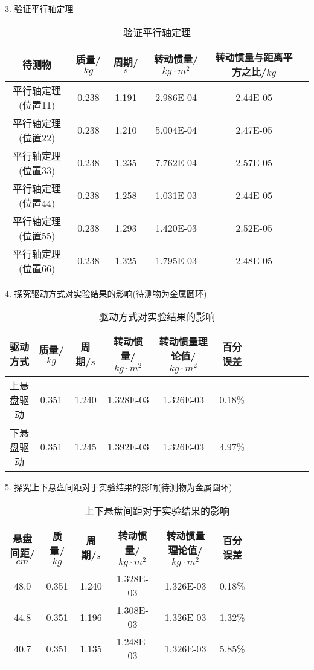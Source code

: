 \documentclass[12pt,hyperref,a4paper,UTF8]{ctexart}
\begin{document}
3. 验证平行轴定理

\begin{table}[h!]
\centering

\begin{tabular}{|c|c|c|c|c|c|}
    \hline
    待测物 & 质量/$kg$ & 周期/$s$ & 转动惯量/$kg·m^2$ & 转动惯量与距离平方之比/$kg$ \\
    \hline
    平行轴定理(位置11) & 0.238 & 1.191 & 2.986E-04 & 2.44E-05 \\
    \hline
    平行轴定理(位置22) & 0.238 & 1.210 & 5.004E-04 & 2.47E-05 \\
    \hline
    平行轴定理(位置33) & 0.238 & 1.235 & 7.762E-04 & 2.57E-05 \\
    \hline
    平行轴定理(位置44) & 0.238 & 1.258 & 1.031E-03 & 2.44E-05 \\
    \hline
    平行轴定理(位置55) & 0.238 & 1.293 & 1.420E-03 & 2.52E-05 \\
    \hline
    平行轴定理(位置66) & 0.238 & 1.325 & 1.795E-03 & 2.48E-05 \\
    \hline
\end{tabular}
\caption{验证平行轴定理}
\end{table}

4. 探究驱动方式对实验结果的影响(待测物为金属圆环)

\begin{table}[h!]
\centering
\begin{tabular}{|c|c|c|c|c|c|c|c|c|c|c|c|}
      \hline
      驱动方式 & 质量/$kg$ & 周期/$s$ & 转动惯量/$kg·m^2$ & 转动惯量理论值/$kg·m^2$ & 百分误差 \\
      \hline
        上悬盘驱动 & 0.351 & 1.240 &  1.328E-03 & 1.326E-03 & 0.18\% \\
      \hline
        下悬盘驱动 & 0.351 & 1.245 &  1.392E-03 & 1.326E-03 & 4.97\% \\
      \hline
\end{tabular}
\caption{驱动方式对实验结果的影响}
\end{table}

5. 探究上下悬盘间距对于实验结果的影响(待测物为金属圆环)

\begin{table}[h!]
\centering
\begin{tabular}{|c|c|c|c|c|c|c|c|c|c|c|c|}
        \hline
        悬盘间距/$cm$ & 质量/$kg$ & 周期/$s$ & 转动惯量/$kg·m^2$ & 转动惯量理论值/$kg·m^2$ & 百分误差 \\
        \hline
          48.0 & 0.351 & 1.240 &  1.328E-03 & 1.326E-03 & 0.18\% \\
        \hline
          44.8 & 0.351 & 1.196 &  1.308E-03 & 1.326E-03 & 1.32\% \\
        \hline
          40.7 & 0.351 & 1.135 &  1.248E-03 & 1.326E-03 & 5.85\% \\
        \hline
\end{tabular}
\caption{上下悬盘间距对于实验结果的影响}
\end{table}
\end{document}
